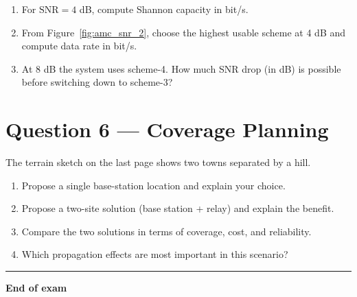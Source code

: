 \documentclass[11pt,a4paper]{article}
\begin{document}
\begin{enumerate}[label=\alph*)]
    \item For $\mathrm{SNR}=4$ dB, compute Shannon capacity in bit/s.
    \item From Figure~\ref{fig:amc_snr_2}, choose the highest usable scheme at 4 dB and compute data rate in bit/s.
    \item At 8 dB the system uses scheme-4. How much SNR drop (in dB) is possible before switching down to scheme-3?
\end{enumerate}

\section*{Question 6 --- Coverage Planning}
The terrain sketch on the last page shows two towns separated by a hill.

\begin{enumerate}[label=\alph*)]
\item Propose a single base-station location and explain your choice.
\item Propose a two-site solution (base station + relay) and explain the benefit.
\item Compare the two solutions in terms of coverage, cost, and reliability.
\item Which propagation effects are most important in this scenario?
\end{enumerate}

\vspace{0.6cm}
\hrule
\vspace{0.3cm}
\textbf{End of exam}


\clearpage
\label{LastPage}
\end{document}
